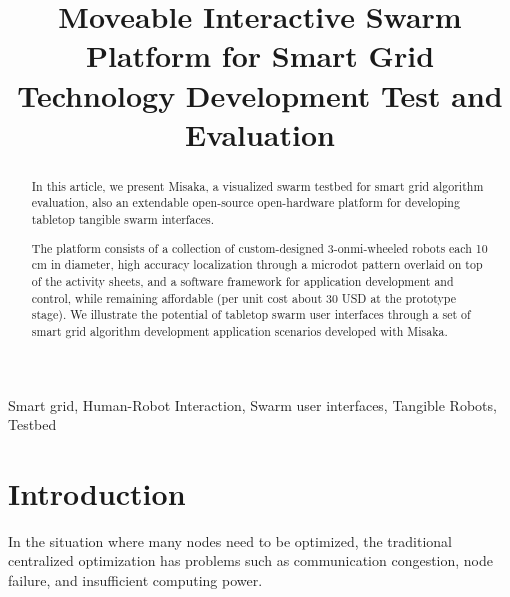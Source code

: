 \documentclass[conference]{IEEEtran}
\begin{document}
\title{Moveable Interactive Swarm Platform for Smart Grid Technology Development Test and Evaluation\\}

\author{
\and
{}
}

\maketitle

\begin{abstract}
    In this article, we present Misaka, a visualized swarm testbed for smart grid algorithm evaluation, also an extendable open-source open-hardware platform for developing tabletop tangible swarm interfaces\cite{yan2019consensus}.

    The platform consists of a collection of custom-designed 3-onmi-wheeled robots each 10 cm in diameter, high accuracy localization through a microdot pattern overlaid on top of the activity sheets, and a software framework for application development and control, while remaining affordable (per unit cost about 30 USD at the prototype stage). We illustrate the potential of tabletop swarm user interfaces through a set of smart grid algorithm development application scenarios developed with Misaka.
\end{abstract}

\begin{IEEEkeywords}
    Smart grid, Human-Robot Interaction, Swarm user interfaces, Tangible Robots, Testbed
\end{IEEEkeywords}

\section{Introduction}

In the situation where many nodes need to be optimized, the traditional centralized optimization has problems such as communication congestion, node failure, and insufficient computing power\cite{yan2019consensus}.
\end{document}

